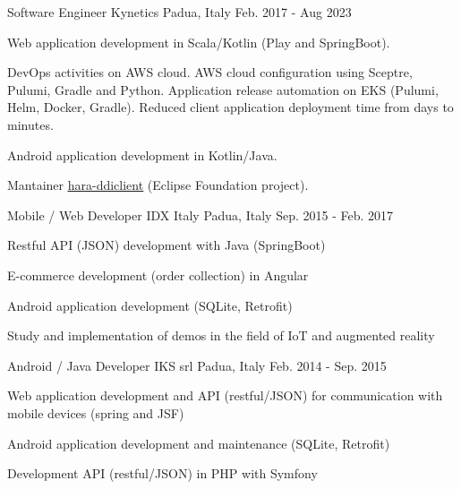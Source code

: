 

\begin{cventries}

  \cventry
    {Software Engineer} %
    {Kynetics} %
    {Padua, Italy} %
    {Feb. 2017 - Aug 2023} %
    {
    \begin{cvitems}
    		\item Web application development in Scala/Kotlin (Play and SpringBoot).
    		\item DevOps activities on AWS cloud. AWS cloud configuration using Sceptre, Pulumi, Gradle and Python. Application release automation on EKS (Pulumi, Helm, Docker, Gradle). Reduced client application deployment time from days to minutes.
    		\item Android application development in Kotlin/Java.
    		\item Mantainer \href{https://github.com/eclipse-hara/hara-ddiclient}{\underline{hara-ddiclient}} (Eclipse Foundation project).
    \end{cvitems}
    }

  \cventry
    {Mobile / Web Developer} %
    {IDX Italy} %
	{Padua, Italy} %
    {Sep. 2015 - Feb. 2017} %
    {
      \begin{cvitems} %
        \item {Restful API (JSON) development with Java (SpringBoot)}
        \item {E-commerce development (order collection) in Angular}
        \item {Android application development (SQLite, Retrofit)}
        \item {Study and implementation of demos in the field of IoT and augmented reality}
      \end{cvitems}
    }

  \cventry
    {Android / Java Developer} %
    {IKS srl} %
	{Padua, Italy} %
    {Feb. 2014 - Sep. 2015} %
    {
      \begin{cvitems} %
        \item {Web application development and API (restful/JSON) for communication with mobile devices (spring and JSF)}
        \item {Android application development and maintenance (SQLite, Retrofit)}
        \item {Development API (restful/JSON) in PHP with Symfony}
      \end{cvitems}
    }

\end{cventries}
